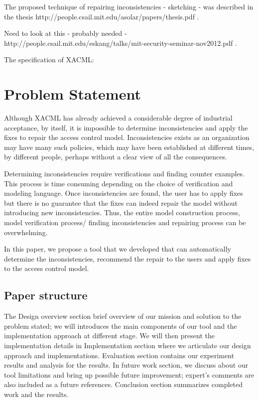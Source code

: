 \documentclass{acm_proc_article-sp}
\begin{document}
The proposed technique of repairing inconsistencies - sketching - was described in the thesis http://people.csail.mit.edu/asolar/papers/thesis.pdf .

Need to look at this - probably needed - http://people.csail.mit.edu/eskang/talks/mit-security-seminar-nov2012.pdf .

The specification of XACML:

\section{Problem Statement}

Although XACML has already achieved a considerable degree of industrial acceptance, by itself, it is impossible to determine inconsistencies and apply the fixes to repair the access control model. Inconsistencies exists as an organization may have many such policies, which may have been established at different times, by different people, perhaps without a clear view of all the consequences. 

Determining inconsistencies require verifications and finding counter examples. This process is time consuming depending on the choice of verification and modeling language. Once inconsistencies are found, the user has to apply fixes but there is no guarantee that the fixes can indeed repair the model without introducing new inconsistencies. Thus, the entire model construction process, model verification process/ finding inconsistencies and repairing process can be overwhelming.

In this paper, we propose a tool that we developed that can automatically determine the inconsistencies, recommend the repair to the users and apply fixes to the access control model.

\subsection{Paper structure}
The Design overview section brief overview of our mission and solution to the problem stated; we will introduces the main components of our tool and the implementation approach at different stage. We will then present the implementation details in Implementation section where we articulate our design approach and implementations. Evaluation section contains our experiment results and analysis for the results. In future work section, we discuss about our tool limitations and bring up possible future improvement; expert's comments are also included as a future references. Conclusion section summarizes completed work and the results.
\end{document}
